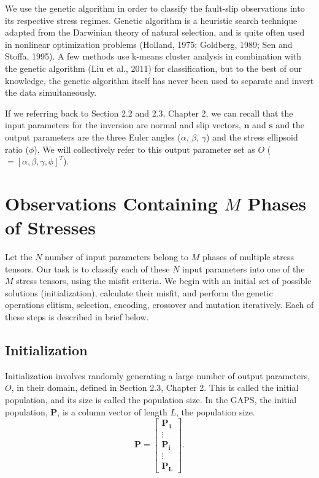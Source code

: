 \onehalfspacing
We use the genetic algorithm in order to classify the fault-slip observations into its respective stress regimes. Genetic algorithm is a heuristic search technique adapted from the Darwinian theory of natural selection, and is quite often used in nonlinear optimization problems (Holland, 1975; Goldberg, 1989; Sen and Stoffa, 1995). A few methods use k-means cluster analysis in combination with the genetic algorithm (Liu et al., 2011) for classification, but to the best of our knowledge, the genetic algorithm itself has never been used to separate and invert the data simultaneously. 

If we referring back to Section 2.2 and 2.3, Chapter 2, we can recall that the input parameters for the inversion are normal and slip vectors, $\bm{n}$ and $\bm{s}$ and the output parameters are the three Euler angles ($\alpha$, $\beta$, $\gamma$) and the stress ellipsoid ratio ($\phi$). We will collectively refer to this output parameter set as $O$ ($ = [\alpha, \beta, \gamma, \phi]^T$).

\section{Observations Containing $M$ Phases of Stresses}
Let the $N$ number of input parameters belong to $M$ phases of multiple stress tensors. Our task is to classify each of these $N$ input parameters into one of the $M$ stress tensors, using the misfit criteria. We begin with an initial set of possible solutions (initialization), calculate their misfit, and perform the genetic operations elitism, selection, encoding, crossover and mutation iteratively. Each of these steps is described in brief below.

\subsection{Initialization}
Initialization involves randomly generating a large number of output parameters, $O$, in their domain, defined in Section 2.3, Chapter 2. This is called the initial population, and its size is called the population size. In the GAPS, the initial population, $\bm{P}$, is a column vector of length $L$, the population size.
\begin{equation} \label{18}
\bm{P} =
\begin{bmatrix}
\bm{P_1} \\
\vdots \\
\bm{P_i} \\
\vdots \\
\bm{P_L}
\end{bmatrix}.
\end{equation}

